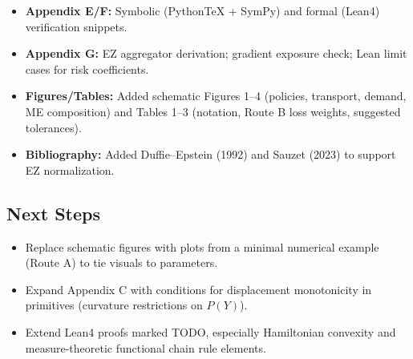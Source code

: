 ﻿\documentclass[11pt,letterpaper,oneside]{article}
\numberwithin{equation}{section}
\newcommand{\1}{\mathbf{1}}
\begin{document}
\begin{itemize}[leftmargin=1.15em,itemsep=0.25em]
  \item \textbf{Appendix E/F:} Symbolic (PythonTeX + SymPy) and formal (Lean4) verification snippets.
  \item \textbf{Appendix G:} EZ aggregator derivation; gradient exposure check; Lean limit cases for risk coefficients.
  \item \textbf{Figures/Tables:} Added schematic Figures 1–4 (policies, transport, demand, ME composition) and Tables 1–3 (notation, Route B loss weights, suggested tolerances).
  \item \textbf{Bibliography:} Added Duffie–Epstein (1992) and Sauzet (2023) to support EZ normalization.
\end{itemize}

\subsection*{Next Steps}
\begin{itemize}[leftmargin=1.15em,itemsep=0.25em]
  \item Replace schematic figures with plots from a minimal numerical example (Route A) to tie visuals to parameters.
  \item Expand Appendix C with conditions for displacement monotonicity in primitives (curvature restrictions on $P(Y)$).
  \item Extend Lean4 proofs marked TODO, especially Hamiltonian convexity and measure-theoretic functional chain rule elements.
\end{itemize}


\printbibliography[heading=bibintoc,title={References}]
\end{document}

